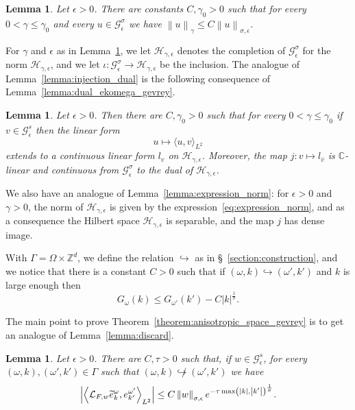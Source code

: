 \documentclass[10pt]{amsart}
\newtheorem{lemm}[theo]{Lemma}\newtheorem{prop}[theo]{Proposition}\newtheorem{coro}[theo]{Corollary}\newtheorem{conj}[theo]{Conjecture}
\theoremstyle{definition}\newtheorem{defi}[theo]{Definition}\newtheorem{rema}[theo]{Remark}\newtheorem{exam}[theo]{Example}\newtheorem{exem}[theo]{Example}\newtheorem{nota}[theo]{Notation}
\newcommand{\n}[1]{\left\|#1\right\|}
\newcommand{\va}[1]{\left|#1\right|}
\newcommand{\clL}{\mathcal{L}}
\newcommand{\clH}{\mathcal{H}}
\newcommand{\clG}{\mathcal{G}}
\newcommand{\bbZ}{\mathbb{Z}}
\newcommand{\bbC}{\mathbb{C}}
\let\oldtilde\tilde
\renewcommand*{\tilde}[1]{\mathchoice{\widetilde{#1}}{\widetilde{#1}}{\oldtilde{#1}}{\oldtilde{#1}}}
\begin{document}
\begin{lemm}\label{lemma:finite_norm_gevrey}
Let $\epsilon > 0$. There are constants $C,\gamma_0 > 0$ such that for every $0 < \gamma \leq \gamma_0$ and every $u \in \clG_\epsilon^\sigma$ we have $\n {u}_{\gamma} \leq C\n{u}_{\sigma,\epsilon}$.
\end{lemm}

For $\gamma$ and $\epsilon$ as in Lemma~\ref{lemma:finite_norm_gevrey}, we let $\clH_{\gamma,\epsilon}$ denotes the completion of $\clG_\epsilon^\sigma$ for the norm $\clH_{\gamma,\epsilon}$, and we let $\iota : \clG_\epsilon^\sigma \to \clH_{\gamma,\epsilon}$ be the inclusion. The analogue of Lemma~\ref{lemma:injection_dual} is the following consequence of Lemma~\ref{lemma:dual_ekomega_gevrey}.

\begin{lemm}\label{lemma:dual_inclusion_gevrey}
Let $\epsilon > 0$. Then there are $C,\gamma_0 >0$ such that for every $0 < \gamma \leq \gamma_0$ if $v \in \clG_\epsilon^s$ then the linear form
\begin{equation*}
u \mapsto \langle u, v \rangle_{L^2}
\end{equation*}
extends to a continuous linear form $l_v$ on $\clH_{\gamma,\epsilon}$. Moreover, the map $j : v \mapsto l_{\bar{v}}$ is $\bbC$-linear and continuous from $\clG_\epsilon^\sigma$ to the dual of $\clH_{\gamma,\epsilon}$.
\end{lemm}

We also have an analogue of Lemma~\ref{lemma:expression_norm}: for $\epsilon > 0$ and $\gamma > 0$, the norm of $\clH_{\gamma,\epsilon}$ is given by the expression~\eqref{eq:expression_norm}, and as a consequence the Hilbert space $\clH_{\gamma,\epsilon}$ is separable, and the map $j$ has dense image.

With $\Gamma = \Omega \times \bbZ^d$, we define the relation $\hookrightarrow$ as in \S~\ref{section:construction}, and we notice that there is a constant $C > 0$ such that if $(\omega,k) \hookrightarrow (\omega',k')$ and $k$ is large enough then
\begin{equation*}
G_{\omega}(k) \leq G_{\omega'}(k') - C \va{k}^{\frac{1}{\sigma}}.
\end{equation*}

The main point to prove Theorem~\ref{theorem:anisotropic_space_gevrey} is to get an analogue of Lemma~\ref{lemma:discard}.

\begin{lemm}\label{lemma:discard_gevrey}
Let $\epsilon > 0$. There are $C, \tau >0$ such that, if $w \in \clG_\epsilon^s$, for every $(\omega,k),(\omega',k') \in \Gamma$ such that $(\omega,k) \not\hookrightarrow (\omega',k')$ we have
\begin{equation*}
\va{\left\langle \clL_{F,w} \tilde{e}_{k}^{\omega}, e_{k'}^{\omega'}\right\rangle_{L^2}} \leq C \n{w}_{\sigma,\epsilon} e^{ - \tau \max\left(\va{k},\va{k'}\right)^{\frac{1}{\sigma}}}.
\end{equation*}
\end{lemm}
\end{document}
